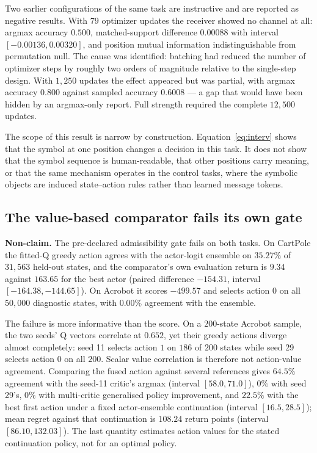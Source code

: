 \documentclass[11pt,a4paper]{article}
\begin{document}
Two earlier configurations of the same task are instructive and are reported as negative results. With $79$ optimizer updates the receiver showed no channel at all: argmax accuracy $0.500$, matched-support difference $0.00088$ with interval $[-0.00136, 0.00320]$, and position mutual information indistinguishable from permutation null. The cause was identified: batching had reduced the number of optimizer steps by roughly two orders of magnitude relative to the single-step design. With $1{,}250$ updates the effect appeared but was partial, with argmax accuracy $0.800$ against sampled accuracy $0.6008$ --- a gap that would have been hidden by an argmax-only report. Full strength required the complete $12{,}500$ updates.

The scope of this result is narrow by construction. Equation~\eqref{eq:interv} shows that the symbol at one position changes a decision in this task. It does not show that the symbol sequence is human-readable, that other positions carry meaning, or that the same mechanism operates in the control tasks, where the symbolic objects are induced state--action rules rather than learned message tokens.

\subsection{The value-based comparator fails its own gate}
\label{sec:res-gpi}

\textbf{Non-claim.} The pre-declared admissibility gate fails on both tasks. On CartPole the fitted-Q greedy action agrees with the actor-logit ensemble on $35.27\%$ of $31{,}563$ held-out states, and the comparator's own evaluation return is $9.34$ against $163.65$ for the best actor (paired difference $-154.31$, interval $[-164.38,-144.65]$). On Acrobot it scores $-499.57$ and selects action $0$ on all $50{,}000$ diagnostic states, with $0.00\%$ agreement with the ensemble.

The failure is more informative than the score. On a $200$-state Acrobot sample, the two seeds' Q vectors correlate at $0.652$, yet their greedy actions diverge almost completely: seed 11 selects action $1$ on $186$ of $200$ states while seed 29 selects action $0$ on all $200$. Scalar value correlation is therefore not action-value agreement. Comparing the fused action against several references gives $64.5\%$ agreement with the seed-11 critic's argmax (interval $[58.0,71.0]$), $0\%$ with seed 29's, $0\%$ with multi-critic generalised policy improvement, and $22.5\%$ with the best first action under a fixed actor-ensemble continuation (interval $[16.5,28.5]$); mean regret against that continuation is $108.24$ return points (interval $[86.10,132.03]$). The last quantity estimates action values for the stated continuation policy, not for an optimal policy.
\end{document}
